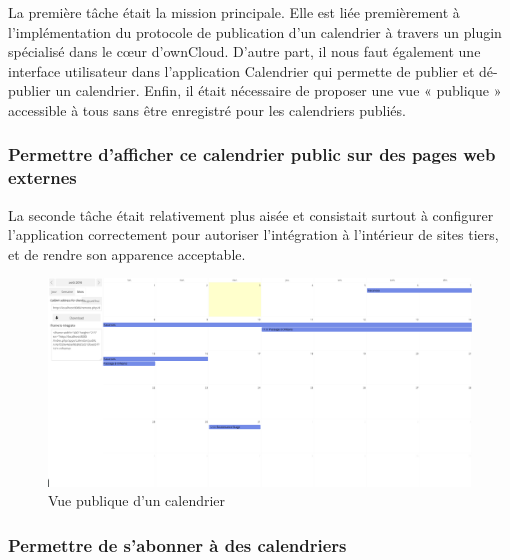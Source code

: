 \documentclass[10pt,a4paper, twoside]{report}
\begin{document}
	La première tâche était la mission principale. Elle est liée premièrement à l'implémentation du protocole de publication d'un calendrier à travers un plugin spécialisé dans le cœur d'ownCloud. D'autre part, il nous faut également une interface utilisateur dans l'application Calendrier qui permette de publier et dé-publier un calendrier. Enfin, il était nécessaire de proposer une vue « publique » accessible à tous sans être enregistré pour les calendriers publiés.

	
	\subsubsection{Permettre d'afficher ce calendrier public sur des pages web externes}La seconde tâche était relativement plus aisée et consistait surtout à configurer l'application correctement pour autoriser l'intégration à l'intérieur de sites tiers, et de rendre son apparence acceptable.
	
	\begin{figure}[ht]
		\centering
		\centerline{\includegraphics[width=1.5\textwidth]{images/calendrier-vue-publique.png}}
		\caption*{Vue publique d'un calendrier}
		\label{normal_case}
	\end{figure}
	
	
	\subsubsection{Permettre de s'abonner à des calendriers}
	
\end{document}
